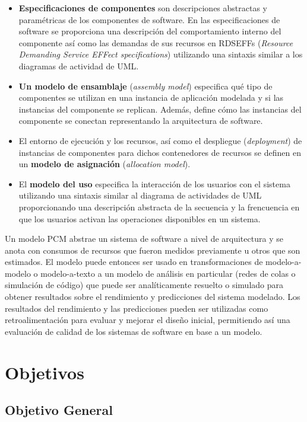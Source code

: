 \documentclass[11pt, twoside]{report}
\begin{document}
\begin{itemize}
    \item \textbf{Especificaciones de componentes} son descripciones abstractas y paramétricas de los componentes de software. En las especificaciones de software se proporciona una descripción del comportamiento interno del componente así como las demandas de sus recursos en RDSEFFs (\emph{Resource Demanding Service EFFect specifications}) utilizando una sintaxis similar a los diagramas de actividad de UML.
    \item \textbf{Un modelo de ensamblaje} (\emph{assembly model}) especifica qué tipo de componentes se utilizan en una instancia de aplicación modelada y si las instancias del componente se replican. Además, define cómo las instancias del componente se conectan representando la arquitectura de software.
    \item El entorno de ejecución y los recursos, así como el despliegue (\emph{deployment}) de instancias de componentes para dichos contenedores de recursos se definen en un \textbf{modelo de asignación} (\emph{allocation model}).
    \item El \textbf{modelo del uso} especifica la interacción de los usuarios con el sistema utilizando una sintaxis similar al diagrama de actividades de UML proporcionando una descripción abstracta de la secuencia y la frencuencia en que los usuarios activan las operaciones disponibles en un sistema.
\end{itemize}

Un modelo PCM abstrae un sistema de software a nivel de arquitectura y se anota con consumos de recursos que fueron medidos previamente u otros que son estimados. El modelo puede entonces ser usado en transformaciones de modelo-a-modelo o modelo-a-texto a un modelo de análisis en particular (redes de colas o simulación de código) que puede ser analíticamente resuelto o simulado para obtener resultados sobre el rendimiento y predicciones del sistema modelado. Los resultados del rendimiento y las predicciones pueden ser utilizadas como retroalimentación para evaluar y mejorar el diseño inicial, permitiendo así una evaluación de calidad de los sistemas de software en base a un modelo\cite{noorshams}.

\chapter{Objetivos}

\section{Objetivo General}
\end{document}
